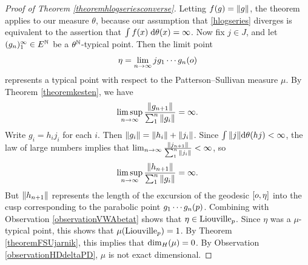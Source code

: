 \begin{proof}[Proof of Theorem \ref{theoremhlogseriesconverse}]
Letting $f(g) = \|g\|$, the theorem applies to our measure $\theta$, because our assumption that \eqref{hlogseries} diverges is equivalent to the assertion that $\int f(x) \;\mathrm{d}\theta(x) = \infty$. Now fix $j\in J$, and let $(g_n)_1^\infty \in E^\N$ be a $\theta^\N$-typical point. Then the limit point
\[
\eta = \lim_{n\to\infty} j g_1\cdots g_n(o)
\]
represents a typical point with respect to the Patterson--Sullivan measure $\mu$. By Theorem \ref{theoremkesten}, we have
\[
\limsup_{n\to\infty} \frac{\|g_{n + 1}\|}{\sum_1^n \|g_i\|} = \infty.
\]
Write $g_i = h_i j_i$ for each $i$. Then $\|g_i\| = \|h_i\| + \|j_i\|$. Since $\int \|j\|\mathrm{d}\theta(hj) < \infty$, the law of large numbers implies that $\lim_{n \to \infty} \frac{\|j_{n + 1}\|}{\sum_1^n \|j_i\|} < \infty$, so
\[
\limsup_{n\to\infty} \frac{\|h_{n + 1}\|}{\sum_1^n \|g_i\|} = \infty.
\]
But $\|h_{n + 1}\|$ represents the length of the excursion of the geodesic $[o,\eta]$ into the cusp corresponding to the parabolic point $g_1\cdots g_n(p)$. Combining with Observation \ref{observationVWAbetat} shows that $\eta\in\mathrm{Liouville}_p$. Since $\eta$ was a $\mu$-typical point, this shows that $\mu(\mathrm{Liouville}_p) = 1$. By Theorem \ref{theoremFSUjarnik}, this implies that ${\dim_H}(\mu) = 0$. By Observation \ref{observationHDdeltaPD}, $\mu$ is not exact dimensional.
\end{proof}

\endinput
